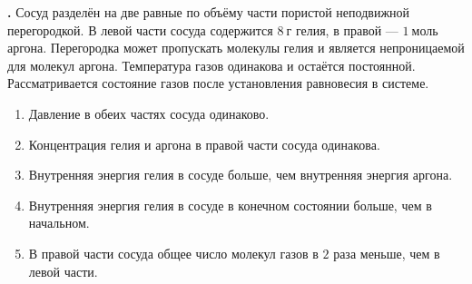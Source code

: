 \documentclass[12pt,a4paper]{article}
\newif\ifShowSolutions
\newcounter{banktask}
\newcommand{\BankTask}[3]{%
  \refstepcounter{banktask}%
  \Needspace{35mm}\par\medskip\noindent\begin{minipage}{\linewidth}%
  \noindent\textbf{\thebanktask.}\quad #2\par
  \ifShowSolutions
    #3\par
    \ifdefined\TutorEdition
      \ifcsname TutorSource#1\endcsname
        \smallskip{\small\csname TutorSource#1\endcsname\par}%
      \fi
    \fi
  \fi
  \end{minipage}\par\medskip
}
\begin{document}
\BankTask{84BDA5}{
Сосуд разделён на две равные по объёму части пористой неподвижной перегородкой. В левой части сосуда содержится $8\ \text{г}$ гелия, в правой --- $1\ \text{моль}$ аргона. Перегородка может пропускать молекулы гелия и является непроницаемой для молекул аргона. Температура газов одинакова и остаётся постоянной.
Рассматривается состояние газов после установления равновесия в системе.
\begin{enumerate}
\item Давление в обеих частях сосуда одинаково.
\item Концентрация гелия и аргона в правой части сосуда одинакова.
\item Внутренняя энергия гелия в сосуде больше, чем внутренняя энергия аргона.
\item Внутренняя энергия гелия в сосуде в конечном состоянии больше, чем в начальном.
\item В правой части сосуда общее число молекул газов в $2$ раза меньше, чем в левой части.
\end{enumerate}
}{
\smallskip\noindent\textbf{Решение от GPT}\par
Молярная масса гелия $M_{\mathrm{He}}=4\ \text{г/моль}$, поэтому $\nu_{\mathrm{He}}=8/4=2\ \text{моль}$. В равновесии концентрация гелия одинакова в обеих частях: в каждой находится по $1\ \text{моль}$ гелия. Весь аргон ($1\ \text{моль}$) остаётся справа. Пусть объём каждой части равен $V$.
\begin{enumerate}
\item Неверно: $p_{\text{лев}}=\dfrac{(1\ \text{моль})RT}{V}$, $p_{\text{прав}}=2p_{\text{лев}}$.
\item Верно: справа количества гелия и аргона равны, поэтому равны и их концентрации.
\item Верно: оба газа одноатомные, $U=\frac32\nu RT$; следовательно, $U_{\mathrm{He}}/U_{\mathrm{Ar}}=2$.
\item Неверно: количество гелия и его температура не изменились, поэтому его внутренняя энергия постоянна.
\item Неверно: справа общее число молекул в $2$ раза больше, чем слева.
\end{enumerate}
Ответ: $23$.
}
\end{document}
